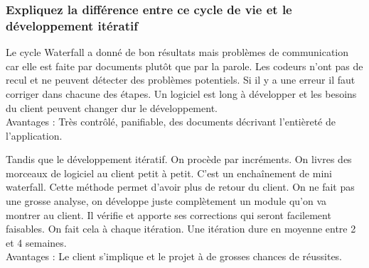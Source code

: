 \subsubsection{Expliquez la différence entre ce cycle de vie et le développement itératif}
\color[rgb]{0,0.48,0.58}
Le cycle Waterfall a donné de bon résultats mais problèmes de communication car elle est faite par documents plutôt que par la parole. Les codeurs n'ont pas de recul et ne peuvent détecter des problèmes potentiels. Si il y a une erreur il faut corriger dans chacune des étapes. Un logiciel est long à développer et les besoins du client peuvent changer dur le développement.
\\Avantages : Très contrôlé, panifiable, des documents décrivant l'entièreté de l'application.

Tandis que le développement itératif. On procède par incréments. On livres des morceaux de logiciel au client petit à petit. C'est un enchaînement de mini waterfall. Cette méthode permet d'avoir plus de retour du client. On ne fait pas une grosse analyse, on développe juste complètement un module qu'on va montrer au client. Il vérifie et apporte ses corrections qui seront facilement faisables. On fait cela à chaque itération. Une itération dure en moyenne entre 2 et 4 semaines.
\\Avantages : Le client s'implique et le projet à de grosses chances de réussites.
\color[rgb]{0,0,0}